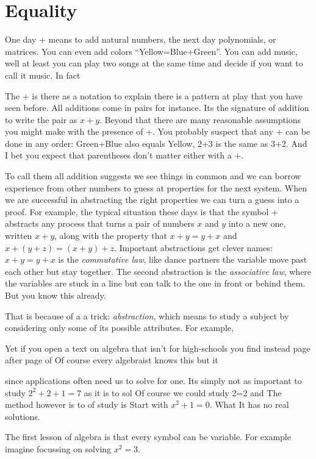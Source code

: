 
\chapter{Equality}

One day  $+$ means to add natural numbers, the next day 
polynomials, or matrices.   You can even add colors ``Yellow=Blue+Green''.
You can add music, well at least you can play two songs at the same time 
and decide if you want to call it music.  In fact 

The + is there as a notation to explain 
there is a pattern at play that you have seen before.  All additions 
come in pairs for instance.  Its the signature of addition to write 
the pair as $x+y$.  Beyond that there are many reasonable assumptions 
you might make with the presence of $+$.  You probably suspect 
that any $+$ can be done in any order: Green+Blue also equals Yellow, 
2+3 is the same as 3+2.  And I bet you expect that parentheses don't 
matter either with a $+$.

To call them all addition suggests we see things in common and 
we can borrow experience from other numbers to guess at properties 
for the next system.  When we are successful in abstracting the 
right properties we can turn a guess into a proof.  For example,
the typical situation these days is that the symbol $+$ abstracts 
any process that turns a pair of numbers $x$ and $y$ into a new one,
written $x+y$, along  with the property that $x+y=y+x$ and $x+(y+z)=(x+y)+z$.
Important abstractions get clever names: $x+y=y+x$ is the 
\emph{commutative law}, like dance partners the variable move past each other but 
stay together.  The second abstraction is the \emph{associative law}, where 
the variables are stuck in a line but can talk to the one in front or behind them.
But you know this already.


That is because 
of a a trick: \emph{abstraction}, which means to study a subject 
by considering only some of its possible attributes.  For example, 

Yet if you open a text on algebra that isn't for high-schools
you find instead page after page of 
Of course every algebraist knows this but it 

since applications often need us to solve for one.
Its simply not as important to study $2^2+2+1=7$  
as it is to sol
Of course we could study 2=2 and 
The method however is 
to  of study is  Start with $x^2+1=0$.
What
It has no 
real solutions.


The first lesson of algebra is that every symbol can be variable.
For example imagine focussing on solving $x^2=3$.  


